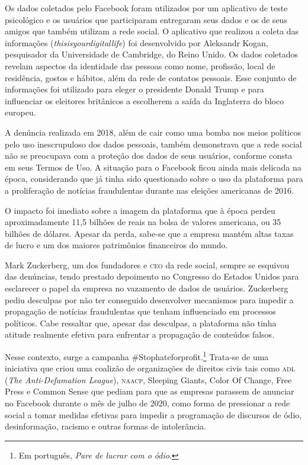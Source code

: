 Os dados coletados pelo Facebook foram utilizados por um aplicativo de
teste psicológico e os usuários que participaram entregaram
seus dados e os de seus amigos que também utilizam a rede social. O
aplicativo que realizou a coleta das
informações (\textit{thisisyourdigitallife}) foi desenvolvido por
Aleksandr Kogan, pesquisador da Universidade de Cambridge, do Reino
Unido. Os dados coletados revelam aspectos da identidade das pessoas
como nome, profissão, local de residência, gostos e hábitos, além da
rede de contatos pessoais. Esse conjunto de informações foi utilizado
para eleger o presidente Donald Trump e para influenciar os eleitores
britânicos a escolherem a saída da Inglaterra do bloco europeu.

A denúncia realizada em 2018, além de cair como uma bomba nos meios
políticos pelo uso inescrupuloso dos dados pessoais, também demonstrava
que a rede social não se preocupava com a proteção dos dados de seus
usuários, conforme consta em seus Termos de Uso. A situação para o
Facebook ficou ainda mais delicada na época, considerando que já tinha
sido questionado sobre o uso da plataforma para a proliferação de
notícias fraudulentas durante nas eleições americanas de 2016.

O impacto foi imediato sobre a imagem da plataforma que à época perdeu
aproximadamente 11,5 bilhões de reais na bolsa de valores americana, ou 
35 bilhões de dólares. Apesar da perda, sabe-se que a empresa mantém altas taxas de
lucro e um dos maiores patrimônios financeiros do mundo.

Mark Zuckerberg, um dos fundadores e \textsc{ceo} da rede social, sempre se
esquivou das denúncias, tendo prestado depoimento no Congresso do
Estados Unidos para esclarecer o papel da empresa no vazamento de dados
de usuários. Zuckerberg pediu desculpas por não ter conseguido
desenvolver mecanismos para impedir a propagação de notícias
fraudulentas que tenham influenciado em processos políticos. Cabe
ressaltar que, apesar das desculpas, a plataforma não tinha atitude
realmente efetiva para enfrentar a propagação de conteúdos falsos.

Nesse contexto, surge a campanha \#Stophateforprofit.\footnote{Em português, \textit{Pare de lucrar com o ódio}.} Trata-se de uma iniciativa que
criou uma coalizão de organizações de direitos civis tais como \textsc{adl} (\textit{The Anti-Defamation League}), \textsc{naacp}, Sleeping Giants, Color Of
Change, Free Press e Common Sense que pediam para que as empresas
parassem de anunciar no Facebook durante o mês de julho de 2020, como
forma de pressionar a rede social a tomar medidas efetivas para impedir
a programação de discursos de ódio, desinformação, racismo e outras
formas de intolerância.


